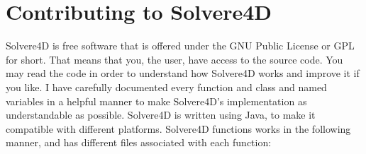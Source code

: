 \documentclass[singlecolumn,12pt]{article}
\begin{document}
\newpage
\section{Contributing to Solvere4D}

Solvere4D is free software that is offered under the GNU Public
License or GPL for short. That means that you, the user, have access
to the source code. You may read the code in order to understand how
Solvere4D works and improve it if you like. I have carefully
documented every function and class and named variables in a helpful
manner to make Solvere4D's implementation as understandable as
possible. Solvere4D is written using Java, to make it compatible
with different platforms. Solvere4D functions works in the following
manner, and has different files associated with each function:
\end{document}
